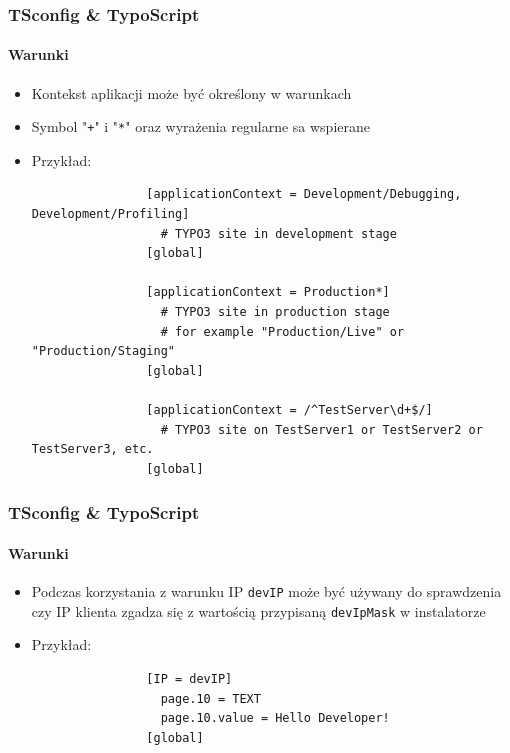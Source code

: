 \begin{frame}[fragile]
	\frametitle{TSconfig \& TypoScript}
	\framesubtitle{Warunki}

	\begin{itemize}
		\item Kontekst aplikacji może być określony w warunkach
		\item Symbol "\texttt{+}" i "\texttt{*}" oraz wyrażenia regularne sa wspierane
		\item Przykład:

			\lstset{
				basicstyle=\tiny\ttfamily
			}

			\begin{lstlisting}
				[applicationContext = Development/Debugging, Development/Profiling]
				  # TYPO3 site in development stage
				[global]

				[applicationContext = Production*]
				  # TYPO3 site in production stage
				  # for example "Production/Live" or "Production/Staging"
				[global]

				[applicationContext = /^TestServer\d+$/]
				  # TYPO3 site on TestServer1 or TestServer2 or TestServer3, etc.
				[global]
			\end{lstlisting}

	\end{itemize}

\end{frame}


\begin{frame}[fragile]
	\frametitle{TSconfig \& TypoScript}
	\framesubtitle{Warunki}

	\begin{itemize}

		\item Podczas korzystania z warunku IP \texttt{devIP} może być używany do sprawdzenia czy IP klienta zgadza się z wartością przypisaną \texttt{devIpMask} w instalatorze
		\item Przykład:


			\begin{lstlisting}
				[IP = devIP]
				  page.10 = TEXT
				  page.10.value = Hello Developer!
				[global]
			\end{lstlisting}

	\end{itemize}

\end{frame}

